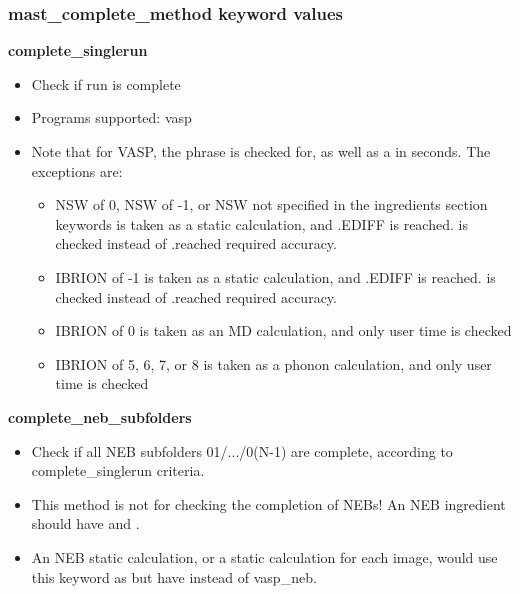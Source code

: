 \documentclass[letterpaper,10pt,english]{sphinxmanual}
\begin{document}
\subsubsection{mast\_complete\_method keyword values}
\label{3_1_2_ingredients:mast-complete-method-keyword-values}
\textbf{complete\_singlerun}
\begin{itemize}
\item {} 
Check if run is complete

\item {} 
Programs supported: vasp

\item {} 
Note that for VASP, the phrase  is checked for, as well as a  in seconds. The exceptions are:
\begin{itemize}
\item {} 
NSW of 0, NSW of -1, or NSW not specified in the ingredients section keywords is taken as a static calculation, and .EDIFF is reached. is checked instead of .reached required accuracy.

\item {} 
IBRION of -1 is taken as a static calculation, and .EDIFF is  reached. is checked instead of .reached required accuracy.

\item {} 
IBRION of 0 is taken as an MD calculation, and only user time is checked

\item {} 
IBRION of 5, 6, 7, or 8 is taken as a phonon calculation, and only user time is checked

\end{itemize}

\end{itemize}

\textbf{complete\_neb\_subfolders}
\begin{itemize}
\item {} 
Check if all NEB subfolders 01/.../0(N-1) are complete, according to complete\_singlerun criteria.

\item {} 
This method is not for checking the completion of NEBs! An NEB ingredient should have  and .

\item {} 
An NEB static calculation, or a static calculation for each image, would use this keyword as  but have  instead of vasp\_neb.

\end{itemize}
\end{document}
